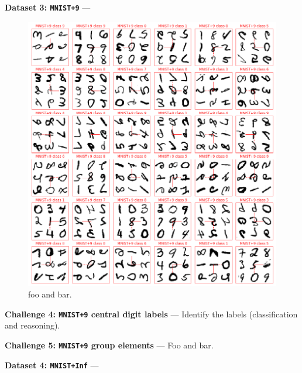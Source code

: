 \documentclass{article}
\renewcommand{\paragraph}[1]{\par\medskip\noindent\textbf{#1} ---}
\begin{document}
\paragraph{Dataset 3: \texttt{MNIST+9}}

\begin{figure}[t!]
\includegraphics[width=\textwidth]{../notebooks/MNIST+9.png}
\caption{foo and bar.\label{fig:9}}
\end{figure}

\paragraph{Challenge 4: \texttt{MNIST+9} central digit labels}
Identify the labels (classification and reasoning).

\paragraph{Challenge 5: \texttt{MNIST+9} group elements}
Foo and bar.

\paragraph{Dataset 4: \texttt{MNIST+Inf}}
\end{document}
